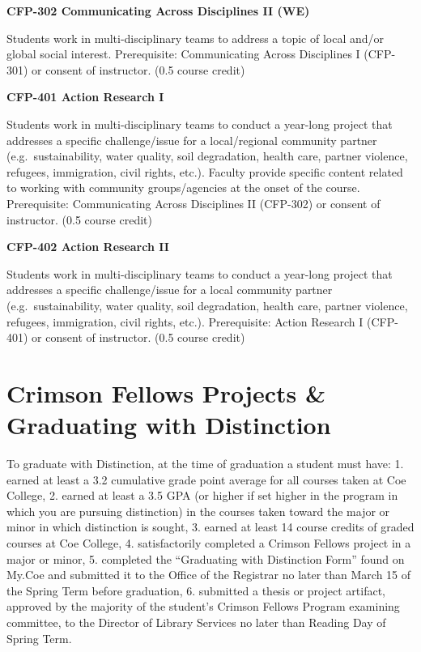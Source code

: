 \documentclass[
  letterpaper,
]{scrbook}
\begin{document}
\textbf{CFP-302 Communicating Across Disciplines II (WE)}

Students work in multi-disciplinary teams to address a topic of local
and/or global social interest. Prerequisite: Communicating Across
Disciplines I (CFP-301) or consent of instructor. (0.5 course credit)

\textbf{CFP-401 Action Research I}

Students work in multi-disciplinary teams to conduct a year-long project
that addresses a specific challenge/issue for a local/regional community
partner (e.g.~sustainability, water quality, soil degradation, health
care, partner violence, refugees, immigration, civil rights, etc.).
Faculty provide specific content related to working with community
groups/agencies at the onset of the course. Prerequisite: Communicating
Across Disciplines II (CFP-302) or consent of instructor. (0.5 course
credit)

\textbf{CFP-402 Action Research II}

Students work in multi-disciplinary teams to conduct a year-long project
that addresses a specific challenge/issue for a local community partner
(e.g.~sustainability, water quality, soil degradation, health care,
partner violence, refugees, immigration, civil rights, etc.).
Prerequisite: Action Research I (CFP-401) or consent of instructor. (0.5
course credit)

\section{Crimson Fellows Projects \& Graduating with
Distinction}\label{crimson-fellows-projects-graduating-with-distinction}

To graduate with Distinction, at the time of graduation a student must
have: 1. earned at least a 3.2 cumulative grade point average for all
courses taken at Coe College, 2. earned at least a 3.5 GPA (or higher if
set higher in the program in which you are pursuing distinction) in the
courses taken toward the major or minor in which distinction is sought,
3. earned at least 14 course credits of graded courses at Coe College,
4. satisfactorily completed a Crimson Fellows project in a major or
minor, 5. completed the ``Graduating with Distinction Form'' found on
My.Coe and submitted it to the Office of the Registrar no later than
March 15 of the Spring Term before graduation, 6. submitted a thesis or
project artifact, approved by the majority of the student's Crimson
Fellows Program examining committee, to the Director of Library Services
no later than Reading Day of Spring Term.
\end{document}
